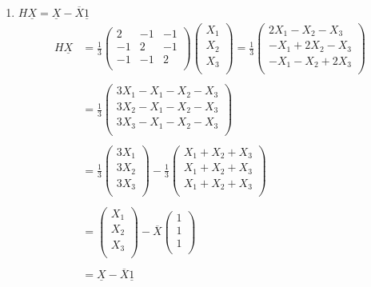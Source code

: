 \documentclass[11pt,a4paper]{article}
\theoremstyle{definition}
\begin{document}
\begin{enumerate}
\item $H\underline{X} = \underline{X} - \overline{X}\underline{1}$
\begin{align*}
H\underline{X} & = \frac{1}{3}\begin{pmatrix}
2 & -1 & -1\\
-1 & 2 & -1\\
-1 & -1 & 2\\
\end{pmatrix}\begin{pmatrix}
X_1 \\
X_2\\
X_3\\
\end{pmatrix}= \frac{1}{3}\begin{pmatrix}
2X_1-X_2-X_3\\
-X_1+2X_2-X_3\\
-X_1-X_2+2X_3\\
\end{pmatrix}\\\\
& = \frac{1}{3}\begin{pmatrix}
3X_1 - X_1 - X_2 - X_3\\
3X_2 - X_1 - X_2 - X_3\\
3X_3 - X_1 - X_2 - X_3\\
\end{pmatrix}\\\\
& = \frac{1}{3}\begin{pmatrix}
3X_1\\
3X_2\\
3X_3\\
\end{pmatrix}-\frac{1}{3}\begin{pmatrix}
X_1 + X_2 + X_3\\
X_1 + X_2 + X_3\\
X_1 + X_2 + X_3\\
\end{pmatrix}\\\\
& = \begin{pmatrix}
X_1\\
X_2\\
X_3\\
\end{pmatrix} - \overline{X}\begin{pmatrix}
1\\
1\\
1\\
\end{pmatrix}\\\\
& = \underline{X}-\overline{X}\underline{1}\\
\end{align*}





\end{enumerate}
\end{document}
